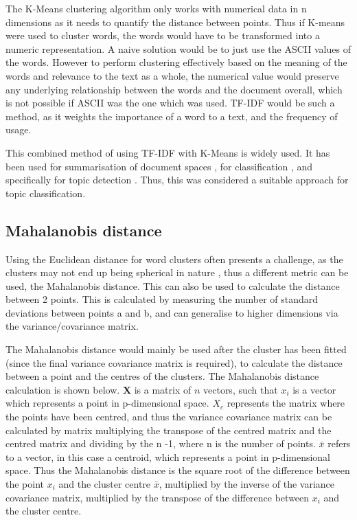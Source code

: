 The K-Means clustering algorithm only works with numerical data in n dimensions as it needs to quantify the distance between points. Thus if K-means were used to cluster words, the words would have to be transformed into a numeric representation. A naive solution would be to just use the ASCII values of the words. However to perform clustering effectively based on the meaning of the words and relevance to the text as a whole, the numerical value would preserve any underlying relationship between the words and the document overall, which is not possible if ASCII was the one which was used. TF-IDF would be such a method, as it weights the importance of a word to a text, and the frequency of usage. 

This combined method of using TF-IDF with K-Means is widely used. It has been used for summarisation of document spaces \cite{khan2019extractive}, for classification \cite{buana2012combination}, and specifically for topic detection \cite{6066301}. Thus, this was considered a suitable approach for topic classification.

\subsection{Mahalanobis distance}

Using the Euclidean distance for word clusters often presents a challenge, as the clusters may not end up being spherical in nature \cite{raykov2016k}, thus a different metric can be used, the Mahalanobis distance. This can also be used to calculate the distance between 2 points. This is calculated by measuring the number of standard deviations between points a and b, and can generalise to higher dimensions via the variance/covariance matrix.

The Mahalanobis distance would mainly be used after the cluster has been fitted (since the final variance covariance matrix is required), to calculate the distance between a point and the centres of the clusters. The Mahalanobis distance calculation is shown below. \textbf{X} is a matrix of $n$ vectors, such that \boldmath$x_{i}$ is a vector which represents a point in p-dimensional space. \boldmath$X_{c}$ represents the matrix where the points have been centred, and thus the variance covariance matrix can be calculated by matrix multiplying the transpose of the centred matrix and the centred matrix and dividing by the n -1, where n is the number of points. $\bar{ x  }$ refers to a vector, in this case a centroid, which represents a point in p-dimensional space. Thus the Mahalanobis distance is the square root of the difference between the point $x_{i}$ and the cluster centre $\bar{ x  }$, multiplied by the inverse of the variance covariance matrix, multiplied by the transpose of the difference between $x_{i}$ and the cluster centre. 


